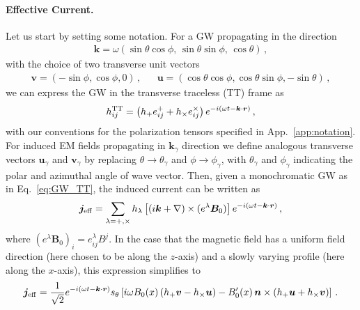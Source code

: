 \documentclass[a4paper,11pt]{article}
\begin{document}
\paragraph{Effective Current.}
%
Let us start by setting some notation. For a GW propagating in the direction
%
\begin{align}
   \bm{k} = \omega \left( \sin \theta \cos \phi, \,
   \sin \theta \sin \phi, \,
   \cos \theta \right)\,, 
\end{align}
%
with the choice of two transverse unit vectors
\begin{align}
    \bm{v} = (-\sin \phi , \cos \phi , 0 ) \,, &&
    \bm{u} = (\cos \theta \cos \phi , \cos \theta \sin \phi , - \sin \theta ) \,,
\end{align}
%
we can express the GW in the transverse traceless (TT) frame as
%
\begin{align}
    h^{\rm TT}_{ij} = \left(  h_{+}  e_{ij}^{+}+ h_{\times}  e_{ij}^{\times} \right) e^{-i (\omega t - {\bm k} \cdot {\bm r}) } \label{eq:GW_TT}
    \,,
\end{align}
%
with our conventions for the polarization tensors specified in App.~\ref{app:notation}.
%
For induced EM fields propagating in $ {\bm k}_{\gamma} $ direction we define analogous transverse vectors $ \bm{u}_{\gamma} $ and $ \bm{v}_{\gamma}$ by replacing $ \theta \rightarrow \theta_{\gamma}$ and  $ \phi \rightarrow \phi_{\gamma}$, with $\theta_\gamma$ and $\phi_\gamma$ indicating the polar and azimuthal angle of wave vector.
%
Then, given a monochromatic GW as in Eq.~\eqref{eq:GW_TT}, the induced current can be written as
%
\begin{align}
  \bm{j}_{\rm eff} = \sum_{\lambda = +,\times} h_{\lambda} \left[ (i \bm{k} + \nabla) \times (e^{\lambda} \bm{B}_{0}) \right] e^{- i (\omega t - \bm{k} \cdot \bm{r} ) }\,,
\end{align}
where $(e^\lambda {\bm B}_{0})_i = e_{ij}^\lambda B^j$.
%
In the case that the magnetic field has a uniform field direction (here chosen to be along the $z$-axis) and a slowly varying profile (here along the $x$-axis), this expression simplifies to
%
\begin{align}
     \bm{j}_{\rm eff}  =  \frac{1}{\sqrt{2}}  e^{- i (\omega t - \bm k \cdot {\bm r} )} s_{\theta} \left[ i \omega B_{0}(x)
 \left(  h_{+} \bm{v} - h_{\times} \bm{u}  \right) - B_{0}^{\prime}(x) \, \bm{n} \times (h_{+} \bm{u} + h_{\times} \bm{v} ) \right] \,.
 \label{eq:jeff_uniform_field_direction}
\end{align}
%
\end{document}
